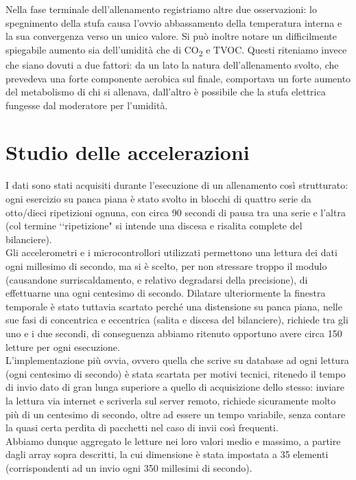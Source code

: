 \documentclass[fleqn,10pt]{SelfArx} %
\begin{document}
Nella fase terminale dell'allenamento registriamo altre due osservazioni: lo spegnimento della 
stufa causa l'ovvio abbassamento della temperatura interna e la sua convergenza verso un unico valore. 
Si può inoltre notare un difficilmente spiegabile aumento sia dell'umidità che di CO\textsubscript{2} e TVOC.
Questi riteniamo invece che siano dovuti a due fattori: da un lato la natura dell'allenamento svolto, 
che prevedeva una forte componente aerobica sul finale, comportava un forte aumento del metabolismo di chi 
si allenava, dall'altro è possibile che la stufa elettrica fungesse dal moderatore per l'umidità.\\

\section{Studio delle accelerazioni}

I dati sono stati acquisiti durante l'esecuzione di un allenamento così strutturato: ogni esercizio su panca piana 
è stato svolto in blocchi di quattro serie da otto/dieci ripetizioni ognuna, con circa 90 
secondi di pausa tra una serie e l'altra (col termine \lq\lq ripetizione" si intende una discesa e risalita complete 
del bilanciere).\\

\noindent
Gli accelerometri e i microcontrollori utilizzati permettono una lettura dei dati ogni millesimo 
di secondo, ma si è scelto, per non stressare troppo il modulo (causandone surriscaldamento, e relativo degradarsi della 
precisione), di effettuarne una ogni centesimo di secondo. Dilatare ulteriormente la finestra temporale è stato 
tuttavia scartato perché una distensione su panca piana, nelle sue fasi di concentrica e eccentrica (salita e 
discesa del bilanciere), richiede tra gli uno e i due secondi, di conseguenza abbiamo ritenuto opportuno 
avere circa 150 letture per ogni esecuzione.\\
L'implementazione più ovvia, ovvero quella che scrive su database ad ogni lettura (ogni 
centesimo di secondo) è stata scartata per motivi tecnici, ritenedo il tempo di invio dato di gran lunga superiore 
a quello di acquisizione dello stesso: inviare la lettura via internet e scriverla sul server remoto, richiede 
sicuramente molto più di un centesimo di secondo, oltre ad essere un tempo variabile, senza contare la quasi certa 
perdita di pacchetti nel caso di invii così frequenti.\\
Abbiamo dunque aggregato le letture nei loro valori medio e massimo, a partire dagli array sopra descritti, 
la cui dimensione è stata impostata a 35 elementi (corrispondenti ad un invio ogni 350 millesimi di secondo).\\
\end{document}
